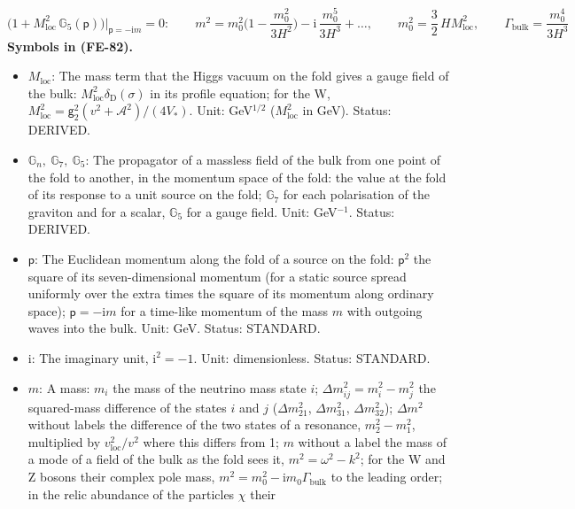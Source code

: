 \documentclass[
  10pt,
]{article}
\providecommand{\tightlist}{%
  \setlength{\itemsep}{0pt}\setlength{\parskip}{0pt}}
\begin{document}
\[
\Big(1 + M_{\mathrm{loc}}^2\,\mathbb{G}_5(\mathsf{p})\Big)\Big\vert_{\mathsf{p} = -\mathrm{i}m} = 0:\qquad
m^2 = m_0^2\Big(1 - \frac{m_0^2}{3H^2}\Big) - \mathrm{i}\,\frac{m_0^5}{3H^3} + \dots,\qquad
m_0^2 = \frac32\,H M_{\mathrm{loc}}^2,\qquad \Gamma_{\mathrm{bulk}} = \frac{m_0^4}{3H^3} \tag{FE-82}
\] \textbf{Symbols in (FE-82).}

\begin{itemize}
\tightlist
\item
  \(M_{\mathrm{loc}}\): The mass term that the Higgs vacuum on the fold
  gives a gauge field of the bulk:
  \(M_{\mathrm{loc}}^2\delta_{\mathrm{D}}(\sigma)\) in its profile
  equation; for the W,
  \(M_{\mathrm{loc}}^2 = \mathsf{g}_2^2(v^2 + \mathcal{A}^2)/(4V_*)\).
  Unit: GeV\(^{1/2}\) (\(M_{\mathrm{loc}}^2\) in GeV). Status: DERIVED.
\item
  \(\mathbb{G}_n,\ \mathbb{G}_7,\ \mathbb{G}_5\): The propagator of a
  massless field of the bulk from one point of the fold to another, in
  the momentum space of the fold: the value at the fold of its response
  to a unit source on the fold; \(\mathbb{G}_7\) for each polarisation
  of the graviton and for a scalar, \(\mathbb{G}_5\) for a gauge field.
  Unit: GeV\(^{-1}\). Status: DERIVED.
\item
  \(\mathsf{p}\): The Euclidean momentum along the fold of a source on
  the fold: \(\mathsf{p}^2\) the square of its seven-dimensional
  momentum (for a static source spread uniformly over the extra times
  the square of its momentum along ordinary space);
  \(\mathsf{p} = -\mathrm{i}m\) for a time-like momentum of the mass
  \(m\) with outgoing waves into the bulk. Unit: GeV. Status: STANDARD.
\item
  \(\mathrm{i}\): The imaginary unit, \(\mathrm{i}^2 = -1\). Unit:
  dimensionless. Status: STANDARD.
\item
  \(m\): A mass: \(m_i\) the mass of the neutrino mass state \(i\);
  \(\Delta m_{ij}^2 = m_i^2 - m_j^2\) the squared-mass difference of the
  states \(i\) and \(j\) (\(\Delta m_{21}^2\), \(\Delta m_{31}^2\),
  \(\Delta m_{32}^2\)); \(\Delta m^2\) without labels the difference of
  the two states of a resonance, \(m_2^2 - m_1^2\), multiplied by
  \(v_{\mathrm{loc}}^2/v^2\) where this differs from 1; \(m\) without a
  label the mass of a mode of a field of the bulk as the fold sees it,
  \(m^2 = \omega^2 - k^2\); for the W and Z bosons their complex pole
  mass, \(m^2 = m_0^2 - \mathrm{i}m_0\Gamma_{\mathrm{bulk}}\) to the
  leading order; in the relic abundance of the particles \(\chi\) their

\end{itemize}
\end{document}
